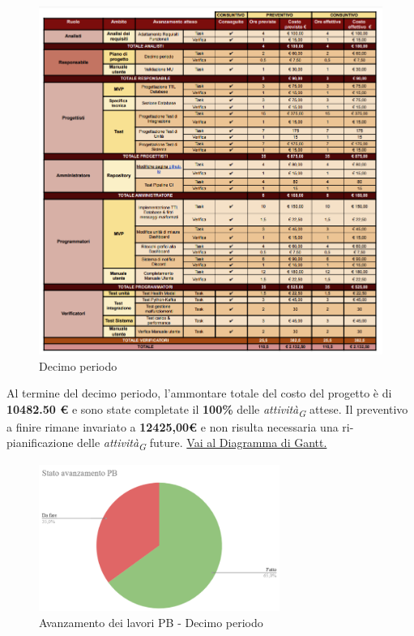 \begin{figure}[H]
    \centering
    \includegraphics[height=1.1\textwidth]{../Images/tabG10.PNG}
    \caption{Decimo periodo}
    \label{fig:Decimo_periodo}
\end{figure}

Al termine del decimo periodo, l'ammontare totale del costo del progetto è di \textbf{10482.50 \euro} e sono state completate il \textbf{100\%} delle \textit{attività}\textsubscript{\textit{G}} attese.
Il preventivo a finire rimane invariato a \textbf{12425,00\euro} e non risulta necessaria una ri-pianificazione delle \textit{attività}\textsubscript{\textit{G}} future.
\href{https://github.com/orgs/ByteOps-swe/projects/3/views/1?sortedBy%5Bdirection%5D=asc&sortedBy%5BcolumnId%5D=64182560}{Vai al Diagramma di Gantt.}

\begin{figure}[H]
    \centering
    \begin{minipage}[b]{0.70\textwidth}
        \centering
        \includegraphics[width=0.7\textwidth]{../Images/torta10.png}
        \caption{Avanzamento dei lavori PB - Decimo periodo}
        \label{fig:Avanzamento_PB_10}
    \end{minipage}
\end{figure}

